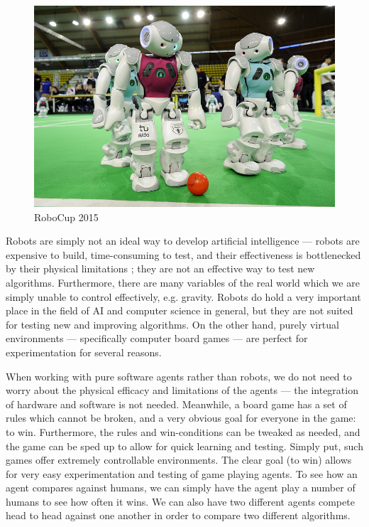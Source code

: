 \begin{figure}[h]
    \centering
    \includegraphics[clip, scale=.25]{images/robocup2015.jpg}
    \caption{RoboCup 2015 \cite{robocup}}
    \label{fig:robocup}
\end{figure}

Robots are simply not an ideal way to develop artificial intelligence --- robots are expensive to build, time-consuming to test, and their effectiveness is bottlenecked by their physical limitations \cite{Gunderson, Bihlmaier}; they are not an effective way to test new algorithms.  Furthermore, there are many variables of the real world which we are simply unable to control effectively, e.g. gravity.  Robots do hold a very important place in the field of AI and computer science in general, but they are not suited for testing new and improving algorithms.  On the other hand, purely virtual environments --- specifically computer board games --- are perfect for experimentation for several reasons.

When working with pure software agents rather than robots, we do not need to worry about the physical efficacy and limitations of the agents --- the integration of hardware and software is not needed.  Meanwhile, a board game has a set of rules which cannot be broken, and a very obvious goal for everyone in the game: to win.  Furthermore, the rules and win-conditions can be tweaked as needed, and the game can be sped up to allow for quick learning and testing.  Simply put, such games offer extremely controllable environments.  The clear goal (to win) allows for very easy experimentation and testing of game playing agents.  To see how an agent compares against humans, we can simply have the agent play a number of humans to see how often it wins.  We can also have two different agents compete head to head against one another in order to compare two different algorithms.

